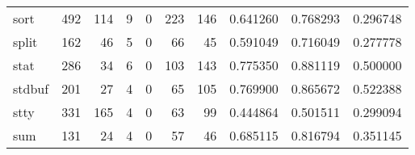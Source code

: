 \begin{tabular}{lrrrrrrrrr}
sort      &                                                492 &                                                114 &                                                  9 &                                                  0 &                                                223 &                                                146 &                                           0.641260 &                               0.768293 &                             0.296748 \\
split     &                                                162 &                                                 46 &                                                  5 &                                                  0 &                                                 66 &                                                 45 &                                           0.591049 &                               0.716049 &                             0.277778 \\
stat      &                                                286 &                                                 34 &                                                  6 &                                                  0 &                                                103 &                                                143 &                                           0.775350 &                               0.881119 &                             0.500000 \\
stdbuf    &                                                201 &                                                 27 &                                                  4 &                                                  0 &                                                 65 &                                                105 &                                           0.769900 &                               0.865672 &                             0.522388 \\
stty      &                                                331 &                                                165 &                                                  4 &                                                  0 &                                                 63 &                                                 99 &                                           0.444864 &                               0.501511 &                             0.299094 \\
sum       &                                                131 &                                                 24 &                                                  4 &                                                  0 &                                                 57 &                                                 46 &                                           0.685115 &                               0.816794 &                             0.351145 \\

\end{tabular}
